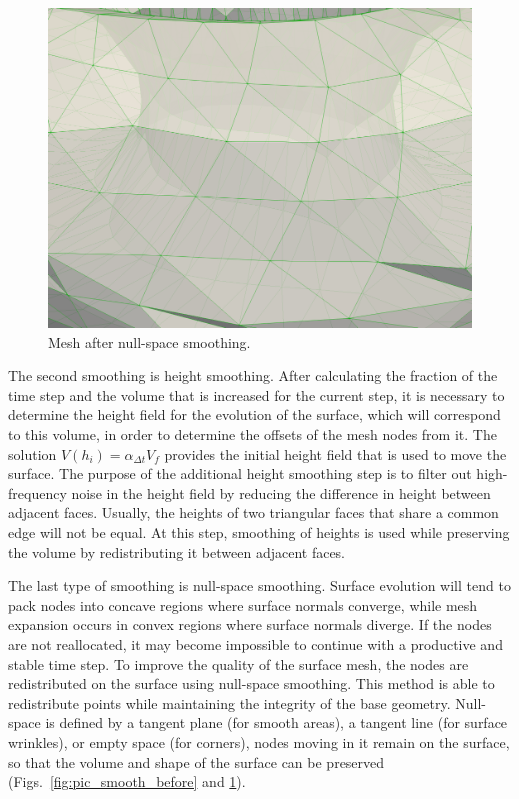 \begin{figure}[ht]
\centering
\includegraphics[width=\textwidth]{pics/text_1_remesh_3d/pic_smooth_after.png}
\caption{Mesh after null-space smoothing.}\label{fig:pic_smooth_after}
\end{figure}

The second smoothing is height smoothing.
After calculating the fraction of the time step and the volume that is increased for the current step, it is necessary to determine the height field for the evolution of the surface, which will correspond to this volume, in order to determine the offsets of the mesh nodes from it.
The solution $V(h_i) = \alpha_{\Delta t} V_f$ provides the initial height field that is used to move the surface.
The purpose of the additional height smoothing step is to filter out high-frequency noise in the height field by reducing the difference in height between adjacent faces.
Usually, the heights of two triangular faces that share a common edge will not be equal.
At this step, smoothing of heights is used while preserving the volume by redistributing it between adjacent faces.

The last type of smoothing is null-space smoothing.
Surface evolution will tend to pack nodes into concave regions where surface normals converge, while mesh expansion occurs in convex regions where surface normals diverge.
If the nodes are not reallocated, it may become impossible to continue with a productive and stable time step.
To improve the quality of the surface mesh, the nodes are redistributed on the surface using null-space smoothing.
This method is able to redistribute points while maintaining the integrity of the base geometry.
Null-space is defined by a tangent plane (for smooth areas),  a
tangent line (for surface wrinkles), or empty space (for corners),
nodes moving in it remain on the surface, so that the volume and
shape of the surface can be preserved
(Figs.~\ref{fig:pic_smooth_before} and \ref{fig:pic_smooth_after}).
